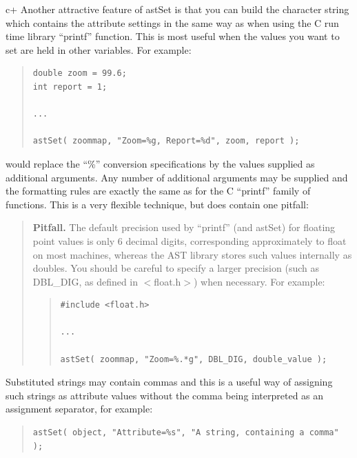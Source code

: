 \documentclass[twoside,11pt]{article}
\begin{document}
c+
Another attractive feature of astSet is that you can build the
character string which contains the attribute settings in the same way
as when using the C run time library ``printf'' function. This is most
useful when the values you want to set are held in other
variables. For example:

\begin{quote}
\small
\begin{verbatim}
double zoom = 99.6;
int report = 1;

...

astSet( zoommap, "Zoom=%g, Report=%d", zoom, report );
\end{verbatim}
\normalsize
\end{quote}

would replace the ``\%'' conversion specifications by the values
supplied as additional arguments. Any number of additional arguments
may be supplied and the formatting rules are exactly the same as for
the C ``printf'' family of functions. This is a very flexible
technique, but does contain one pitfall:

\begin{quote}
{\bf{Pitfall.}} The default precision used by ``printf'' (and astSet)
for floating point values is only 6 decimal digits, corresponding
approximately to float on most machines, whereas the AST library
stores such values internally as doubles. You should be careful to
specify a larger precision (such as DBL\_DIG, as defined in
$<$float.h$>$) when necessary. For example:

\begin{quote}
\small
\begin{verbatim}
#include <float.h>

...

astSet( zoommap, "Zoom=%.*g", DBL_DIG, double_value );
\end{verbatim}
\normalsize
\end{quote}
\end{quote}

Substituted strings may contain commas and this is a useful way of
assigning such strings as attribute values without the comma being
interpreted as an assignment separator, for example:

\begin{quote}
\small
\begin{verbatim}
astSet( object, "Attribute=%s", "A string, containing a comma" );
\end{verbatim}
\normalsize
\end{quote}
\end{document}
